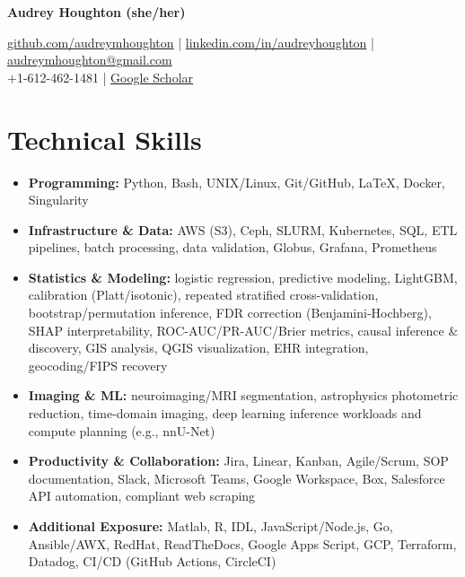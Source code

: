 \documentclass[a4paper,11pt]{article}
\makeatletter
\newcommand{\resumeItemListStart}{\begin{justify}\begin{itemize}[leftmargin=3ex, rightmargin=2ex, noitemsep,labelsep=1.2mm,itemsep=0mm]\small}
\newcommand{\resumeItemListEnd}{\end{itemize}\end{justify}\vspace{-1.5mm}}
\newcommand{\name}{Audrey Houghton (she/her)} %
\newcommand{\phone}{612-462-1481} %
\newcommand{\emaila}{audreymhoughton@gmail.com} %
\newcommand{\github}{audreymhoughton} %
\newcommand{\linkedin}{audreyhoughton} %
\makeatother
\begin{document}
\selectfont

\begin{center}
    \LARGE{\textbf{\name}}
\end{center}
\vspace{-5mm}
\begin{center}
    \small{\href{https://github.com/\github}{\faGithub \hspace{0.2mm} github.com/audreymhoughton} |  \href{https://www.linkedin.com/in/\linkedin/}{\faLinkedinSquare \hspace{0.2mm} linkedin.com/in/audreyhoughton} | \href{mailto:\emaila}{\faSend \hspace{0.2mm} \emaila} \\
    \faPhone \hspace{0.2mm} +1-\phone } | \href{https://scholar.google.com/citations?hl=en&user=ik59nO0AAAAJ&view}{\faGraduationCap Google Scholar}
\end{center}
\vspace{-6mm}

\section{Technical Skills}
\vspace{0.5mm}
\resumeItemListStart
\item[]\textbf{Programming:} Python, Bash, UNIX/Linux, Git/GitHub, LaTeX, Docker, Singularity
\item[]\textbf{Infrastructure \& Data:} AWS (S3), Ceph, SLURM, Kubernetes, SQL, ETL pipelines, batch processing, data validation, Globus, Grafana, Prometheus
\item[]\textbf{Statistics \& Modeling:} logistic regression, predictive modeling, LightGBM, calibration (Platt/isotonic), repeated stratified cross-validation, bootstrap/permutation inference, FDR correction (Benjamini-Hochberg), SHAP interpretability, ROC-AUC/PR-AUC/Brier metrics, causal inference \& discovery, GIS analysis, QGIS visualization, EHR integration, geocoding/FIPS recovery
\item[]\textbf{Imaging \& ML:} neuroimaging/MRI segmentation, astrophysics photometric reduction, time-domain imaging, deep learning inference workloads and compute planning (e.g., nnU-Net)
\item[]\textbf{Productivity \& Collaboration:} Jira, Linear, Kanban, Agile/Scrum, SOP documentation, Slack, Microsoft Teams, Google Workspace, Box, Salesforce API automation, compliant web scraping
\item[]\textbf{Additional Exposure:} Matlab, R, IDL, JavaScript/Node.js, Go, Ansible/AWX, RedHat, ReadTheDocs, Google Apps Script, GCP, Terraform, Datadog, CI/CD (GitHub Actions, CircleCI)
\resumeItemListEnd
\vspace{-3mm}
\end{document}
